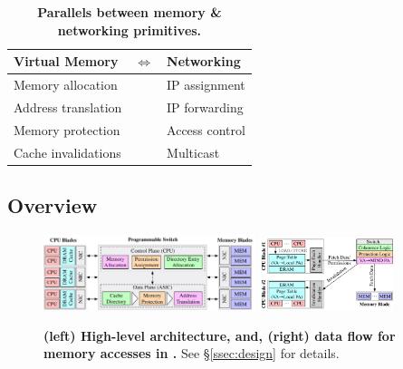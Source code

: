 \begin{table}
    \caption[Parallels between memory \& networking primitives]{\small \textbf{Parallels between memory \& networking primitives.}}\vspace{-1em}
    \label{table:isomorph}
    \centering
    \scriptsize
    \renewcommand{\arraystretch}{1.2}
    \begin{tabular}{p{2cm} p{0.7cm}p{2cm}}
      \hline
      \textbf{Virtual Memory} &$\Longleftrightarrow$ &\textbf{Networking} \\\hline\hline
      Memory allocation&&IP assignment\\
      Address translation &&IP forwarding\\
      Memory protection  &&Access control\\
      Cache invalidations &&Multicast\\
      \hline
    \end{tabular}
    \vspace{-1em}
\end{table}

\subsection{\mind Overview}
\label{ssec:mindoverview}

\begin{figure}[!t]
\centering
\includegraphics[width=0.55\textwidth]{fig/mind/design}\hspace{3em}
\includegraphics[width=0.35\textwidth]{fig/mind/data_flow}%
\vspace{-0.5em}
\caption[High-level \mind architecture and data flow for memory accesses in \mind]{\textbf{(left) High-level \mind architecture, and, (right) data flow for memory accesses in \mind.} See \S\ref{ssec:design} for details.}
\label{fig:system_diagram}
\end{figure}

